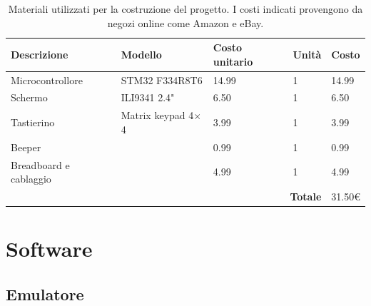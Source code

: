 \documentclass[a4paper]{article}
\begin{document}
\begin{center}
    \begin{table}[ht]
        \centering
        \begin{tabular}{|llll|l|}
            \hline
            \multicolumn{1}{|l|}{\textbf{Descrizione}}          & \multicolumn{1}{l|}{\textbf{Modello}}       & \multicolumn{1}{l|}{\textbf{Costo unitario}} & \textbf{Unità} & \textbf{Costo} \\ \hline
            \multicolumn{1}{|l|}{Microcontrollore}       & \multicolumn{1}{l|}{STM32 F334R8T6}         & \multicolumn{1}{l|}{14.99}                   & 1               & 14.99          \\ \hline
            \multicolumn{1}{|l|}{Schermo}                & \multicolumn{1}{l|}{ILI9341 2.4"}           & \multicolumn{1}{l|}{6.50}                    & 1               & 6.50           \\ \hline
            \multicolumn{1}{|l|}{Tastierino}          & \multicolumn{1}{l|}{Matrix keypad 4$\times$4} & \multicolumn{1}{l|}{3.99}                    & 1               & 3.99           \\ \hline
            \multicolumn{1}{|l|}{Beeper}                 & \multicolumn{1}{l|}{}                       & \multicolumn{1}{l|}{0.99}                    & 1               & 0.99           \\ \hline
            \multicolumn{1}{|l|}{Breadboard e cablaggio} & \multicolumn{1}{l|}{}                       & \multicolumn{1}{l|}{4.99}                    & 1               & 4.99           \\ \hline
            \multicolumn{4}{|r|}{\textbf{Totale}}                                                      & 31.50\euro    \\ \hline
        \end{tabular}
        \caption{
            Materiali utilizzati per la costruzione del progetto. I costi indicati provengono da negozi online come Amazon e eBay.
        }
    \end{table}
\end{center}

\section{Software}


\subsection{Emulatore} %
\end{document}
